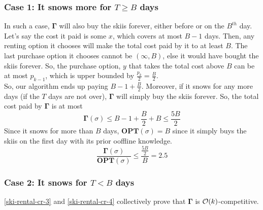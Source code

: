 \documentclass[11pt]{article}
\newcommand{\bigO}{{\cal O}}
\begin{document}
\subsubsection*{Case 1: It snows more for $T \geq B$ days}
In such a case, $\mathbf{\Gamma}$ will also buy the skiis forever, either before or on the $B^{th}$ day. Let's say the cost it
paid is some $x$, which covers at most $B-1$ days. Then, any renting option it chooses will make the total cost paid by it
to at least $B$. The last purchase option it chooses cannot be $(\infty, B)$, else it would have bought the skiis forever. So,
the purchase option, $y$ that takes the total cost above $B$ can be at most $p_{k-1}$, which is upper bounded by
$\frac{p_{k}}{2} = \frac{B}{2}$. \\
So, our algorithm ends up paying $B - 1 + \frac{B}{2}$. Moreover, if it snows for any more days (if the $T$ days are not over),
$\mathbf{\Gamma}$ will simply buy the skiis forever. So, the total cost paid by $\mathbf{\Gamma}$ is at most
\begin{equation}
    \mathbf{\Gamma}(\sigma) \leq B - 1 + \frac{B}{2} + B \leq \frac{5B}{2}
\end{equation}
Since it snows for more than $B$ days, $\mathbf{OPT}(\sigma) = B$ since it simply buys the skiis on the first day with its prior
ooffline knowledge.
\begin{equation}
    \label{ski-rental-cr-3}
    \frac{\mathbf{\Gamma}(\sigma)}{\mathbf{OPT}(\sigma)} \leq \frac{\frac{5B}{2}}{B} = 2.5
\end{equation}

\subsubsection*{Case 2: It snows for $T < B$ days}
\eqref{ski-rental-cr-3} and \eqref{ski-rental-cr-4} collectively prove that $\mathbf{\Gamma}$ is $\bigO(k)$-competitive.
\end{document}

